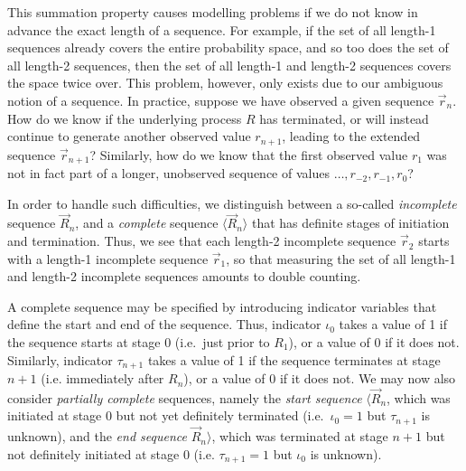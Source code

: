 \documentclass[a4paper]{article}
\begin{document}
This summation property causes modelling problems if we do not know in advance the exact length of
a sequence. For example, if the set of all length-1 sequences already
covers the entire probability space, and so too does the set of all length-2 sequences,
then the set of all length-1 and length-2 sequences covers the space twice over.
This problem, however, only exists due to our ambiguous notion of a sequence.
In practice,  suppose we have observed a given sequence 
$\vec{r}_n$. How do we know if the
underlying process $R$ has terminated, or will instead
continue to generate another observed value
$r_{n+1}$, leading to the extended sequence
$\vec{r}_{n+1}$? 
Similarly, how do we know that the first observed value $r_1$ was not in fact
part of a longer, unobserved sequence of values $\ldots,r_{-2},r_{-1},r_0$?

In order to handle such difficulties, we distinguish between a so-called
{\em incomplete} sequence $\vec{R}_n$, and a {\em complete}
sequence $\langle\vec{R}_n\rangle$ that has definite stages of
initiation and termination. 
Thus, we see that each length-2 incomplete sequence $\vec{r}_2$ starts with a length-1 incomplete
sequence $\vec{r}_1$, so that measuring the set of all length-1 and length-2 incomplete sequences
amounts to double counting.

A complete sequence may be specified by introducing indicator variables
that define the start and end of the sequence.
Thus, indicator $\iota_0$ takes a value of 1 if the sequence
starts at stage 0 (i.e.\ just prior to $R_1$), 
or a value of 0 if it does not.
Similarly, indicator $\tau_{n+1}$ takes a value of 1 if the
sequence terminates at stage $n+1$ (i.e. immediately after $R_n$), or a value of 0 if it does not.
We may now also consider {\em partially complete} sequences, namely
the {\em start sequence}
$\langle\vec{R}_n$, which was initiated at stage 0 but not yet definitely terminated
(i.e.\ $\iota_0=1$ but $\tau_{n+1}$ is unknown),
and the {\em end sequence} $\vec{R}_n\rangle$, which was terminated at stage $n+1$ but not
definitely initiated at stage 0 (i.e. $\tau_{n+1}=1$ but $\iota_0$ is unknown).
\end{document}
